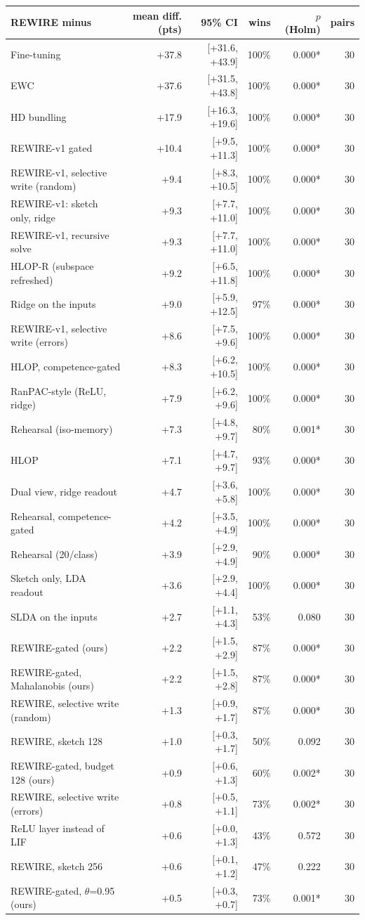 \begin{tabular}{lrrrrr}
\toprule
REWIRE minus & mean diff. (pts) & 95\% CI & wins & $p$ (Holm) & pairs \\
\midrule
Fine-tuning & +37.8 & [+31.6, +43.9] & 100\% & 0.000* & 30 \\
EWC & +37.6 & [+31.5, +43.8] & 100\% & 0.000* & 30 \\
HD bundling & +17.9 & [+16.3, +19.6] & 100\% & 0.000* & 30 \\
REWIRE-v1 gated & +10.4 & [+9.5, +11.3] & 100\% & 0.000* & 30 \\
REWIRE-v1, selective write (random) & +9.4 & [+8.3, +10.5] & 100\% & 0.000* & 30 \\
REWIRE-v1: sketch only, ridge & +9.3 & [+7.7, +11.0] & 100\% & 0.000* & 30 \\
REWIRE-v1, recursive solve & +9.3 & [+7.7, +11.0] & 100\% & 0.000* & 30 \\
HLOP-R (subspace refreshed) & +9.2 & [+6.5, +11.8] & 100\% & 0.000* & 30 \\
Ridge on the inputs & +9.0 & [+5.9, +12.5] & 97\% & 0.000* & 30 \\
REWIRE-v1, selective write (errors) & +8.6 & [+7.5, +9.6] & 100\% & 0.000* & 30 \\
HLOP, competence-gated & +8.3 & [+6.2, +10.5] & 100\% & 0.000* & 30 \\
RanPAC-style (ReLU, ridge) & +7.9 & [+6.2, +9.6] & 100\% & 0.000* & 30 \\
Rehearsal (iso-memory) & +7.3 & [+4.8, +9.7] & 80\% & 0.001* & 30 \\
HLOP & +7.1 & [+4.7, +9.7] & 93\% & 0.000* & 30 \\
Dual view, ridge readout & +4.7 & [+3.6, +5.8] & 100\% & 0.000* & 30 \\
Rehearsal, competence-gated & +4.2 & [+3.5, +4.9] & 100\% & 0.000* & 30 \\
Rehearsal (20/class) & +3.9 & [+2.9, +4.9] & 90\% & 0.000* & 30 \\
Sketch only, LDA readout & +3.6 & [+2.9, +4.4] & 100\% & 0.000* & 30 \\
SLDA on the inputs & +2.7 & [+1.1, +4.3] & 53\% & 0.080 & 30 \\
REWIRE-gated (ours) & +2.2 & [+1.5, +2.9] & 87\% & 0.000* & 30 \\
REWIRE-gated, Mahalanobis (ours) & +2.2 & [+1.5, +2.8] & 87\% & 0.000* & 30 \\
REWIRE, selective write (random) & +1.3 & [+0.9, +1.7] & 87\% & 0.000* & 30 \\
REWIRE, sketch 128 & +1.0 & [+0.3, +1.7] & 50\% & 0.092 & 30 \\
REWIRE-gated, budget 128 (ours) & +0.9 & [+0.6, +1.3] & 60\% & 0.002* & 30 \\
REWIRE, selective write (errors) & +0.8 & [+0.5, +1.1] & 73\% & 0.002* & 30 \\
ReLU layer instead of LIF & +0.6 & [+0.0, +1.3] & 43\% & 0.572 & 30 \\
REWIRE, sketch 256 & +0.6 & [+0.1, +1.2] & 47\% & 0.222 & 30 \\
REWIRE-gated, $\theta$=0.95 (ours) & +0.5 & [+0.3, +0.7] & 73\% & 0.001* & 30 \\
\bottomrule
\end{tabular}
